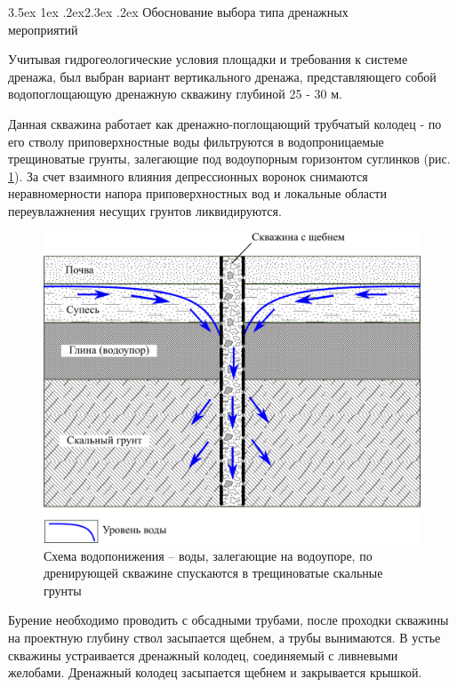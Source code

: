 \documentclass[a4paper,12pt]{article} %
\makeatletter
\renewcommand\section{\@startsection {section}{1}{\parindent}%
	{3.5ex \@plus 1ex \@minus .2ex}{2.3ex \@plus.2ex}%
	{\normalfont\hyphenpenalty=10000\Large\bfseries}}
\makeatother
\begin{document}
\section{Обоснование выбора типа дренажных \\ мероприятий}

Учитывая гидрогеологические условия площадки и требования к системе дренажа, был выбран вариант вертикального дренажа, представляющего собой  водопоглощающую дренажную скважину глубиной 25 - 30 м.  

Данная скважина работает как дренажно-поглощающий трубчатый колодец - по его стволу приповерхностные воды фильтруются в водопроницаемые трещиноватые грунты, залегающие под  водоупорным горизонтом суглинков (рис. \ref{img:scheme1}). За счет взаимного влияния депрессионных воронок снимаются неравномерности напора приповерхностных вод и локальные области переувлажнения несущих грунтов ликвидируются.

\begin{figure}[!h]
	\centering
	\includegraphics{img1.png}
	\caption[Схема водопонижения]{Схема водопонижения – воды, залегающие на водоупоре, по дренирующей скважине спускаются в трещиноватые скальные грунты}
	\label{img:scheme1}
\end{figure}

Бурение необходимо проводить с обсадными трубами, после проходки скважины на проектную глубину ствол засыпается щебнем, а трубы вынимаются. 
В устье скважины устраивается дренажный колодец, соединяемый с ливневыми желобами. Дренажный колодец засыпается щебнем и закрывается крышкой.
\end{document}
